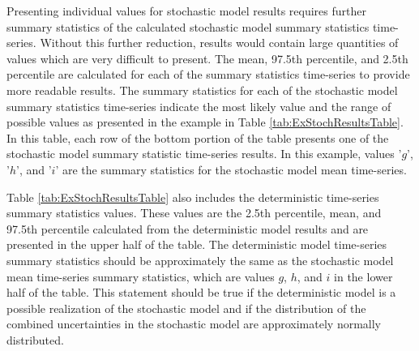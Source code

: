 \begin{linenumbers}
Presenting individual values for stochastic model results requires further summary statistics of the calculated stochastic model summary statistics time-series.  Without this further reduction, results would contain large quantities of values which are very difficult to present.  The mean, 97.5th percentile, and 2.5th percentile are calculated for each of the summary statistics time-series to provide more readable results.  The summary statistics for each of the stochastic model summary statistics time-series indicate the most likely value and the range of possible values as presented in the example in Table \ref{tab:ExStochResultsTable}.  In this table, each row of the bottom portion of the table presents one of the stochastic model summary statistic time-series results.  In this example, values '$ g $', '$ h $', and '$ i $' are the summary statistics for the stochastic model mean time-series.

Table \ref{tab:ExStochResultsTable} also includes the deterministic time-series summary statistics values.  These values are the 2.5th percentile, mean, and 97.5th percentile calculated from the deterministic model results and are presented in the upper half of the table.  The deterministic model time-series summary statistics should be approximately the same as the stochastic model mean time-series summary statistics, which are values $ g $,  $ h $, and $ i $ in the lower half of the table.  This statement should be true if the deterministic model is a possible realization of the stochastic model and if the distribution of the combined uncertainties in the stochastic model are approximately normally distributed.


\end{linenumbers}
